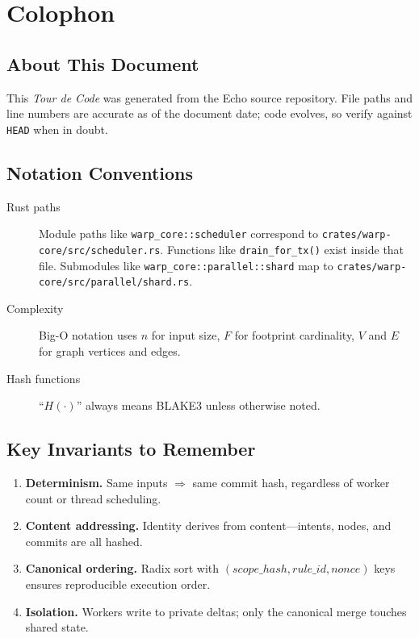 
\chapter*{Colophon}

\section*{About This Document}

This \emph{Tour de Code} was generated from the Echo source repository. File
paths and line numbers are accurate as of the document date; code evolves, so
verify against \texttt{HEAD} when in doubt.

\section*{Notation Conventions}

\begin{description}
  \item[Rust paths] Module paths like \texttt{warp\_core::scheduler}
        correspond to \texttt{crates/warp-core/src/scheduler.rs}. Functions like
        \texttt{drain\_for\_tx()} exist inside that file. Submodules like
        \texttt{warp\_core::parallel::shard} map to \texttt{crates/warp-core/src/parallel/shard.rs}.
  \item[Complexity] Big-O notation uses $n$ for input size, $F$ for footprint
        cardinality, $V$ and $E$ for graph vertices and edges.
  \item[Hash functions] ``$H(\cdot)$'' always means BLAKE3 unless otherwise noted.
\end{description}

\section*{Key Invariants to Remember}

\begin{enumerate}
  \item \textbf{Determinism.} Same inputs $\Rightarrow$ same commit hash,
        regardless of worker count or thread scheduling.
  \item \textbf{Content addressing.} Identity derives from content---intents,
        nodes, and commits are all hashed.
  \item \textbf{Canonical ordering.} Radix sort with $(scope\_hash, rule\_id, nonce)$
        keys ensures reproducible execution order.
  \item \textbf{Isolation.} Workers write to private deltas; only the canonical
        merge touches shared state.
\end{enumerate}

